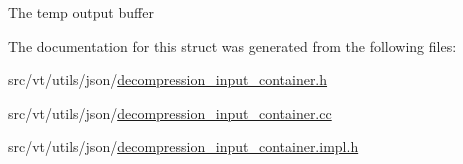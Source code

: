 The temp output buffer 

The documentation for this struct was generated from the following files\+:\begin{DoxyCompactItemize}
\item 
src/vt/utils/json/\hyperlink{decompression__input__container_8h}{decompression\+\_\+input\+\_\+container.\+h}\item 
src/vt/utils/json/\hyperlink{decompression__input__container_8cc}{decompression\+\_\+input\+\_\+container.\+cc}\item 
src/vt/utils/json/\hyperlink{decompression__input__container_8impl_8h}{decompression\+\_\+input\+\_\+container.\+impl.\+h}\end{DoxyCompactItemize}
